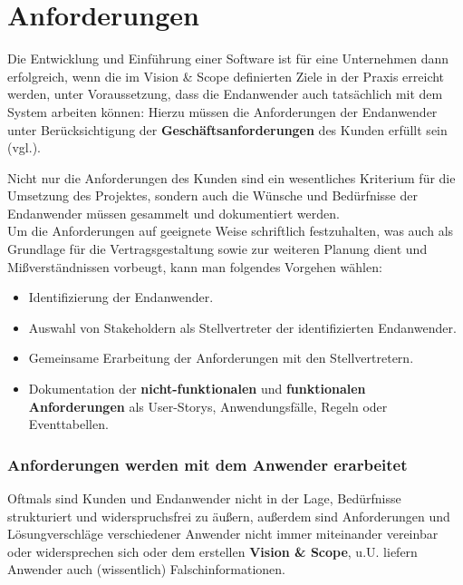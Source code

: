 \section{Anforderungen}\label{sec:anforderungen}

\vspace{5mm}
\begin{tcolorbox}
    Die Entwicklung und Einführung einer Software ist für eine Unternehmen dann erfolgreich, wenn die im Vision \& Scope definierten Ziele in der Praxis erreicht werden, unter Voraussetzung, dass die Endanwender auch tatsächlich mit dem System arbeiten können: Hierzu müssen die Anforderungen der Endanwender unter Berücksichtigung der \textbf{Geschäftsanforderungen} des Kunden erfüllt sein (vgl.\cite[54]{Wed09}).
\end{tcolorbox}
\vspace{5mm}

\noindent
Nicht nur die Anforderungen des Kunden sind ein wesentliches Kriterium für die Umsetzung des Projektes, sondern auch die Wünsche und Bedürfnisse der Endanwender müssen gesammelt und dokumentiert werden.\\

\noindent
Um die Anforderungen auf geeignete Weise schriftlich festzuhalten, was auch als Grundlage für die Vertragsgestaltung sowie zur weiteren Planung dient und Mißverständnissen vorbeugt, kann man folgendes Vorgehen wählen:

\begin{itemize}
    \item Identifizierung der Endanwender.
    \item Auswahl von Stakeholdern als Stellvertreter der identifizierten Endanwender.
    \item Gemeinsame Erarbeitung der Anforderungen mit den Stellvertretern.
    \item Dokumentation der \textbf{nicht-funktionalen} und \textbf{funktionalen Anforderungen} als User-Storys, Anwendungsfälle, Regeln oder Eventtabellen.
\end{itemize}


\noindent
\subsubsection*{Anforderungen werden mit dem Anwender erarbeitet}
Oftmals sind Kunden und Endanwender nicht in der Lage, Bedürfnisse strukturiert und widerspruchsfrei zu äußern, außerdem sind Anforderungen und Lösungverschläge verschiedener Anwender nicht immer miteinander vereinbar oder widersprechen sich oder dem erstellen \textbf{Vision \& Scope}, u.U. liefern Anwender auch (wissentlich) Falschinformationen.\\

